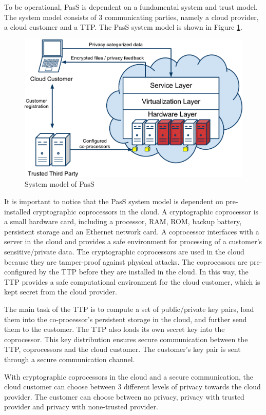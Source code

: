 \documentclass[pdftex,english,10pt,b5paper,twoside]{book}
\begin{document}
To be operational, PasS is dependent on a fundamental system and trust model. The
system model consists of 3 communicating parties, namely a cloud provider, a
cloud customer and a \ac{TTP}. The PasS system model is shown
in Figure \ref{fig:RW:PasS}. 
\begin{figure}[h!]
    \centering
    \includegraphics[scale=0.6]{ArchitecturePasS.pdf}
    \caption{System model of PasS}
    \label{fig:RW:PasS}
\end{figure}
It is important to notice that the PasS system model is dependent on
pre-installed cryptographic coprocessors in the cloud. A cryptographic
coprocessor is a small hardware card, including a processor, RAM, ROM, backup
battery, persistent storage and an Ethernet network card. A coprocessor interfaces
with a server in the cloud and provides a safe environment for processing of
a customer's sensitive/private data. The cryptographic coprocessors are used in the
cloud because they are tamper-proof against physical attacks. The coprocessors
are pre-configured by the TTP before they are installed in the cloud. In this
way, the TTP provides a safe computational environment for the cloud customer,
which is kept secret from the cloud provider.

The main task of the TTP is to compute a set of public/private key pairs, load
them into the co-processor's persistent storage in the cloud, and
further send them to the customer. The TTP also loads its own secret key into
the coprocessor. This key distribution ensures secure communication between the
TTP, coprocessors and the cloud customer. The customer's key pair is sent through a
secure communication channel.

With cryptographic coprocessors in the cloud and a secure communication, the
cloud customer can choose between 3 different levels of privacy towards the
cloud provider. The customer can choose between no privacy, privacy with trusted
provider and privacy with none-trusted provider.
\end{document}
